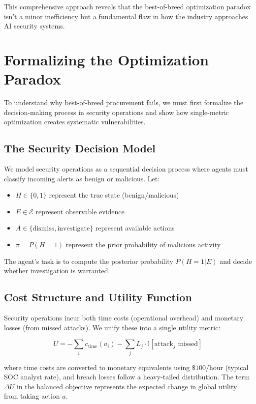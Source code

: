 \documentclass[10pt,conference]{IEEEtran}
\begin{document}
This comprehensive approach reveals that the best-of-breed optimization paradox isn't a minor inefficiency but a fundamental flaw in how the industry approaches AI security systems.

\section{Formalizing the Optimization Paradox}

To understand why best-of-breed procurement fails, we must first formalize the decision-making process in security operations and show how single-metric optimization creates systematic vulnerabilities.

\subsection{The Security Decision Model}

We model security operations as a sequential decision process where agents must classify incoming alerts as benign or malicious. Let:

\begin{itemize}
\item $H \in \{0, 1\}$ represent the true state (benign/malicious)
\item $E \in \mathcal{E}$ represent observable evidence
\item $A \in \{\text{dismiss}, \text{investigate}\}$ represent available actions
\item $\pi = P(H = 1)$ represent the prior probability of malicious activity
\end{itemize}

The agent's task is to compute the posterior probability $P(H = 1 | E)$ and decide whether investigation is warranted.

\subsection{Cost Structure and Utility Function}

Security operations incur both time costs (operational overhead) and monetary losses (from missed attacks). We unify these into a single utility metric:

$$U = -\sum_{i} c_{\text{time}}(a_i) - \sum_{j} L_j \cdot \mathbb{I}[\text{attack}_j \text{ missed}]$$

where time costs are converted to monetary equivalents using $\$100/\text{hour}$ (typical SOC analyst rate), and breach losses follow a heavy-tailed distribution. The term $\Delta U$ in the balanced objective represents the expected change in global utility from taking action $a$.
\end{document}
